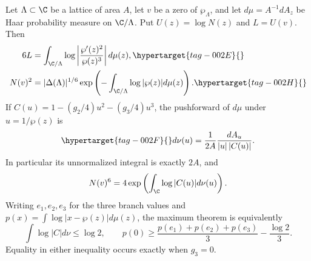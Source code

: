 \begin{proposition}\hypertarget{tag-001T}{}\label{ari:C.8.6}

Let $\Lambda\subset\C$ be a lattice of area $A$, let $v$ be a zero
of $\wp_\Lambda$, and let $d\mu=A^{-1}dA_z$ be Haar probability
measure on $\C/\Lambda$. Put $U(z)=\log N(z)$ and
$L=U(v)$. Then
\begin{align}
 6L&=\int_{\C/\Lambda}\log\left|\frac{\wp'(z)^2}{\wp(z)^3}\right|d\mu(z),
 \hypertarget{tag-002E}{}\label{ari:eq:ca-mahler}\\
 N(v)^2&=|\Delta(\Lambda)|^{1/6}
      \exp\left(-\int_{\C/\Lambda}\log|\wp(z)|d\mu(z)\right).
 \hypertarget{tag-002H}{}\label{ari:eq:ca-wpmean}
\end{align}
If $C(u)=1-(g_2/4)u^2-(g_3/4)u^3$, the pushforward of $d\mu$
under $u=1/\wp(z)$ is
\begin{equation}\hypertarget{tag-002F}{}\label{ari:eq:ca-nu}
 d\nu(u)=\frac1{2A}\frac{dA_u}{|u|\,|C(u)|}.
\end{equation}
In particular its unnormalized integral is exactly $2A$, and
\[
 N(v)^6=4\exp\left(\int_{\C}\log|C(u)|d\nu(u)\right).
\]
Writing $e_1,e_2,e_3$ for the three branch values and
$p(x)=\int\log|x-\wp(z)|d\mu(z)$, the maximum theorem is equivalently
\[
 \int\log|C|d\nu\leq\log2,\qquad
 p(0)\geq\frac{p(e_1)+p(e_2)+p(e_3)}3-\frac{\log2}3.
\]
Equality in either inequality occurs exactly when $g_3=0$.
\end{proposition}


